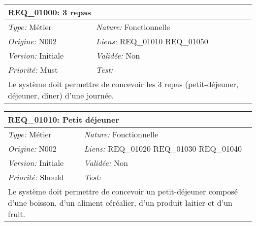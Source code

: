 
\begin{table}[!ht]

\begin{tabular}{|p{60mm}p{100mm}|}

\hline

\multicolumn{2}{|l|}{\textbf{REQ\_01000:} 3 repas} \\ \hline

\emph{Type:} Métier & \emph{Nature:} Fonctionnelle \\

\emph{Origine:} N002 & \emph{Liens:} REQ\_01010 REQ\_01050  \\

\emph{Version:} Initiale & \emph{Validée:} Non \\

\emph{Priorité:} Must & \emph{Test:} \\ \hline

\multicolumn{2}{|p{16cm}|}{Le système doit permettre de concevoir les 3 repas (petit-déjeuner, déjeuner, dîner) d'une journée.} \\ \hline

\end{tabular}

\end{table}



\begin{table}[!ht]

\begin{tabular}{|p{60mm}p{100mm}|}

\hline

\multicolumn{2}{|l|}{\textbf{REQ\_01010:} Petit déjeuner} \\ \hline

\emph{Type:} Métier & \emph{Nature:} Fonctionnelle \\

\emph{Origine:} N002 & \emph{Liens:} REQ\_01020 REQ\_01030 REQ\_01040  \\

\emph{Version:} Initiale & \emph{Validée:} Non \\

\emph{Priorité:} Should & \emph{Test:} \\ \hline

\multicolumn{2}{|p{16cm}|}{Le système doit permettre de concevoir un petit-déjeuner composé d'une boisson, d'un aliment céréalier, d'un produit laitier et d'un fruit.} \\ \hline

\end{tabular}

\end{table}



